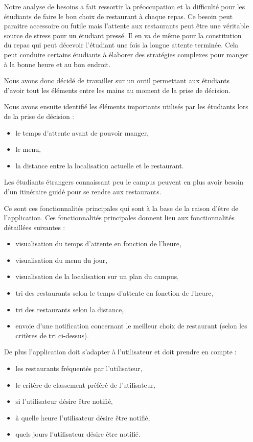 Notre analyse de besoins a fait ressortir la préoccupation et la difficulté
pour les étudiants de faire le bon choix de restaurant à chaque repas.
Ce besoin peut paraitre accessoire ou futile mais l'attente aux restaurants
peut être une véritable source de stress pour un étudiant pressé. Il en
va de même pour la constitution du repas qui peut décevoir l'étudiant une
fois la longue attente terminée. Cela peut conduire certains étudiants à 
élaborer des stratégies complexes pour manger à la bonne heure et au bon
endroit.

Nous avons donc décidé de travailler sur un outil permettant aux étudiants
d'avoir tout les éléments entre les mains au moment de la prise de décision.

Nous avons ensuite identifié les éléments importants utilisés par les étudiants lors de la prise de décision :
\begin{itemize}
\item le temps d'attente avant de pouvoir manger,
\item le menu,
\item la distance entre la localisation actuelle et le restaurant.
\end{itemize}

Les étudiants étrangers connaissant peu le campus peuvent en plus avoir besoin
d'un itinéraire guidé pour se rendre aux restaurants.

Ce sont ces fonctionnalités principales qui sont à la base de la raison
d'être de l'application.
Ces fonctionnalités principales donnent lieu aux fonctionnalités
détaillées suivantes :
\begin{itemize}
\item visualisation du temps d'attente en fonction de
l'heure,
\item visualisation du menu du jour,
\item visualisation de la localisation sur un plan du campus,
\item tri des restaurants selon le temps d'attente en fonction de l'heure,
\item tri des restaurants selon la distance,
\item envoie d'une notification concernant le meilleur choix de restaurant
(selon les critères de tri ci-dessus).
\end{itemize}

De plus l'application doit s'adapter à l'utilisateur et doit prendre en
compte : 
\begin{itemize}
\item les restaurants fréquentés par l'utilisateur,
\item le critère de classement préféré de l'utilisateur,
\item si l'utilisateur désire être notifié,
\item à quelle heure l'utilisateur désire être notifié,
\item quels jours l'utilisateur désire être notifié.
\end{itemize}